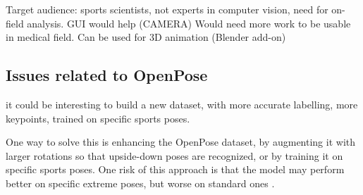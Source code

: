 Target audience: sports scientists, not experts in computer vision, need for on-field analysis. GUI would help (CAMERA)
Would need more work to be usable in medical field. Can be used for 3D animation (Blender add-on)


\subsection{Issues related to OpenPose}

it could be interesting to build a new dataset, with more accurate labelling, more keypoints, trained on specific sports poses.

One way to solve this is enhancing the OpenPose dataset, by augmenting it with larger rotations so that upside-down poses are recognized, or by training it on specific sports poses. One risk of this approach is that the model may perform better on specific extreme poses, but worse on standard ones \cite{Kitamura2022}. 

